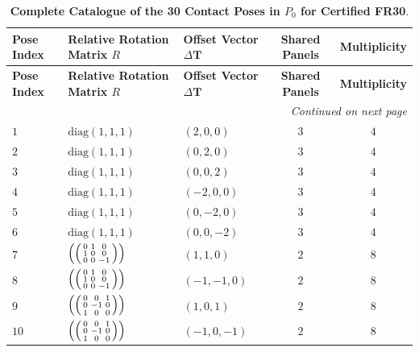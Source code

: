 \documentclass[11pt,a4paper]{article}
\theoremstyle{definition}
\newcommand{\diag}{\mathrm{diag}}
\begin{document}
\begin{longtable}{p{1.2cm}p{3.0cm}p{2.6cm}cc}
\caption{\textbf{Complete Catalogue of the 30 Contact Poses in $P_0$ for Certified FR30}.} \label{tab:app_p0} \\
\toprule
\textbf{Pose Index} & \textbf{Relative Rotation Matrix $R$} & \textbf{Offset Vector $\Delta\mathbf{T}$} & \textbf{Shared Panels} & \textbf{Multiplicity} \\
\midrule
\endfirsthead
\toprule
\textbf{Pose Index} & \textbf{Relative Rotation Matrix $R$} & \textbf{Offset Vector $\Delta\mathbf{T}$} & \textbf{Shared Panels} & \textbf{Multiplicity} \\
\midrule
\endhead
\midrule
\multicolumn{5}{r}{\small\textit{Continued on next page}} \\
\bottomrule
\endfoot
\bottomrule
\endlastfoot
$1$  & $\diag(1, 1, 1)$ & $(2, 0, 0)$ & $3$ & $4$ \\
$2$  & $\diag(1, 1, 1)$ & $(0, 2, 0)$ & $3$ & $4$ \\
$3$  & $\diag(1, 1, 1)$ & $(0, 0, 2)$ & $3$ & $4$ \\
$4$  & $\diag(1, 1, 1)$ & $(-2, 0, 0)$ & $3$ & $4$ \\
$5$  & $\diag(1, 1, 1)$ & $(0, -2, 0)$ & $3$ & $4$ \\
$6$  & $\diag(1, 1, 1)$ & $(0, 0, -2)$ & $3$ & $4$ \\
$7$  & $\left(\begin{psmallmatrix} 0 & 1 & 0 \\ 1 & 0 & 0 \\ 0 & 0 & -1 \end{psmallmatrix}\right)$ & $(1, 1, 0)$ & $2$ & $8$ \\
$8$  & $\left(\begin{psmallmatrix} 0 & 1 & 0 \\ 1 & 0 & 0 \\ 0 & 0 & -1 \end{psmallmatrix}\right)$ & $(-1, -1, 0)$ & $2$ & $8$ \\
$9$  & $\left(\begin{psmallmatrix} 0 & 0 & 1 \\ 0 & -1 & 0 \\ 1 & 0 & 0 \end{psmallmatrix}\right)$ & $(1, 0, 1)$ & $2$ & $8$ \\
$10$ & $\left(\begin{psmallmatrix} 0 & 0 & 1 \\ 0 & -1 & 0 \\ 1 & 0 & 0 \end{psmallmatrix}\right)$ & $(-1, 0, -1)$ & $2$ & $8$ \\

\end{longtable}
\end{document}

